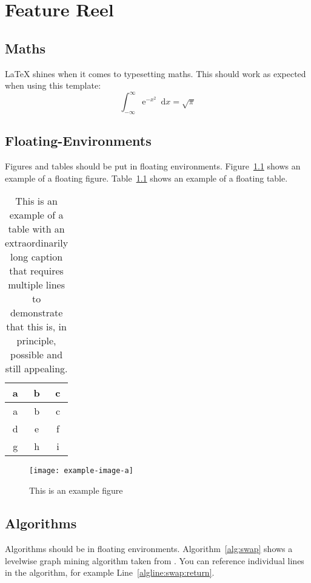 \chapter{Feature Reel} 

\section{Maths}

\LaTeX{} shines when it comes to typesetting maths. This should work as expected when using this template: 
\[ \int_{-\infty}^{\infty} \mathrm{e}^{-x^2} \enspace \mathrm{d}x = \sqrt{\pi} \]

\section{Floating-Environments} 

Figures and tables should be put in floating environments.
Figure~\ref{fig:example-fig} shows an example of a floating figure.
Table~\ref{tab:example-table} shows an example of a floating table.

\begin{table}[ht]
	\centering
	\begin{tabular}{ccc}
		\toprule
		a & b & c \\
		\midrule
		a & b & c \\
		d & e & f \\
		g & h & i \\
		\bottomrule
	\end{tabular}
	\caption{This is an example of a table with an extraordinarily long caption that requires multiple lines to demonstrate that this is, in principle, possible and still appealing.}
	\label{tab:example-table} 
\end{table}

\begin{figure}[ht]
	\centering 
	\texttt{[image: example-image-a]}
	\caption{This is an example figure} 
	\label{fig:example-fig} 
\end{figure}

\section{Algorithms} 
% 
Algorithms should be in floating environments. 
Algorithm~\ref{alg:swap} shows a levelwise graph mining algorithm taken from \cite{theoremofbenda}.
You can reference individual lines in the algorithm, for example Line~\ref{algline:swap:return}.

